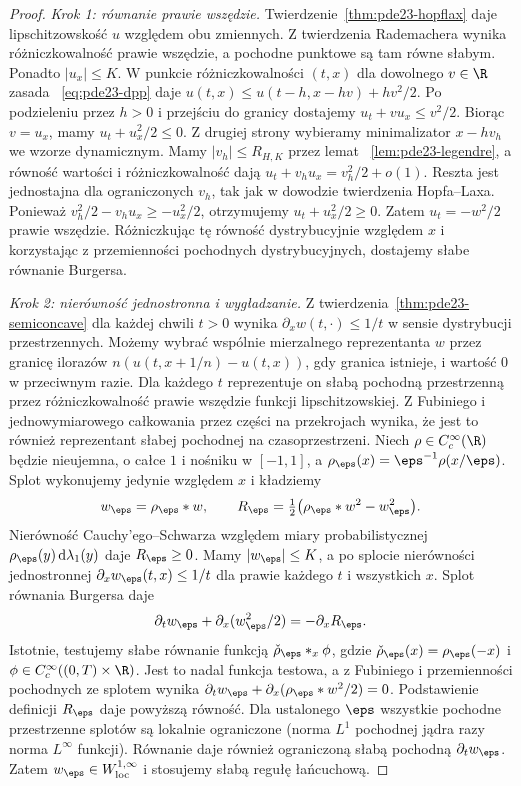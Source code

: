 \begin{proof}
\emph{Krok 1: równanie prawie wszędzie.}
Twierdzenie~\ref{thm:pde23-hopflax} daje
lipschitzowskość $u$ względem obu zmiennych.
Z twierdzenia Rademachera wynika różniczkowalność
prawie wszędzie, a pochodne punktowe są tam
równe słabym. Ponadto $|u_x|\le K$.
W punkcie różniczkowalności $(t,x)$
dla dowolnego $v\in\R$ zasada
~\eqref{eq:pde23-dpp} daje
$u(t,x)\le u(t-h,x-hv)+hv^2/2$.
Po podzieleniu przez $h>0$ i przejściu
do granicy dostajemy $u_t+vu_x\le v^2/2$.
Biorąc $v=u_x$, mamy $u_t+u_x^2/2\le0$.
Z drugiej strony wybieramy minimalizator
$x-hv_h$ we wzorze dynamicznym.
Mamy $|v_h|\le R_{H,K}$ przez lemat
~\ref{lem:pde23-legendre}, a równość wartości
i różniczkowalność dają
$u_t+v_hu_x=v_h^2/2+o(1)$.
Reszta jest jednostajna dla ograniczonych $v_h$,
tak jak w dowodzie twierdzenia Hopfa--Laxa.
Ponieważ $v_h^2/2-v_hu_x\ge-u_x^2/2$,
otrzymujemy $u_t+u_x^2/2\ge0$.
Zatem $u_t=-w^2/2$ prawie wszędzie.
Różniczkując tę równość dystrybucyjnie
względem $x$ i korzystając z przemienności
pochodnych dystrybucyjnych, dostajemy
słabe równanie Burgersa.

\emph{Krok 2: nierówność jednostronna i wygładzanie.}
Z twierdzenia~\ref{thm:pde23-semiconcave}
dla każdej chwili $t>0$ wynika
$\partial_x w(t,\cdot)\le1/t$
w sensie dystrybucji przestrzennych.
Możemy wybrać wspólnie mierzalnego reprezentanta
$w$ przez granicę ilorazów
$n(u(t,x+1/n)-u(t,x))$, gdy granica istnieje,
i wartość $0$ w przeciwnym razie.
Dla każdego $t$ reprezentuje on słabą pochodną
przestrzenną przez różniczkowalność prawie
wszędzie funkcji lipschitzowskiej.
Z Fubiniego i jednowymiarowego całkowania przez
części na przekrojach wynika, że jest to również
reprezentant słabej pochodnej na czasoprzestrzeni.
Niech $\rho\in C_c^\infty(\R)$ będzie
nieujemna, o całce $1$ i nośniku w $[-1,1]$,
a $\rho_\eps(x)=\eps^{-1}\rho(x/\eps)$.
Splot wykonujemy jedynie względem $x$ i kładziemy
\[
 w_\eps=\rho_\eps*w,\qquad
 R_\eps=\tfrac12\bigl(\rho_\eps*w^2-w_\eps^2\bigr).
\]
Nierówność Cauchy'ego--Schwarza względem
miary probabilistycznej $\rho_\eps(y)\,
\mathrm d\lambda_1(y)$ daje $R_\eps\ge0$.
Mamy $|w_\eps|\le K$, a po splocie
nierówności jednostronnej
$\partial_xw_\eps(t,x)\le1/t$ dla prawie
każdego $t$ i wszystkich $x$.
Splot równania Burgersa daje
\[
 \partial_tw_\eps+\partial_x(w_\eps^2/2)
 =-\partial_xR_\eps.
\]
Istotnie, testujemy słabe równanie funkcją
$\check\rho_\eps*_{x}\phi$, gdzie
$\check\rho_\eps(x)=\rho_\eps(-x)$ i
$\phi\in C_c^\infty((0,T)\times\R)$.
Jest to nadal funkcja testowa, a z Fubiniego
i przemienności pochodnych ze splotem wynika
$\partial_tw_\eps+\partial_x(\rho_\eps*w^2/2)=0$.
Podstawienie definicji $R_\eps$ daje powyższą
równość.
Dla ustalonego $\eps$ wszystkie pochodne
przestrzenne splotów są lokalnie ograniczone
(norma $L^1$ pochodnej jądra razy norma
$L^\infty$ funkcji). Równanie daje również
ograniczoną słabą pochodną $\partial_tw_\eps$.
Zatem $w_\eps\in W^{1,\infty}_{\mathrm{loc}}$
i stosujemy słabą regułę łańcuchową.


\end{proof}
